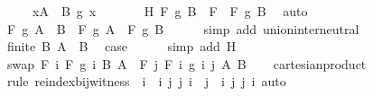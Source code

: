 \begin{isabellebody}
\ \ \ \ \ {\isachardoublequoteopen}{\isasymforall}x{\isasymin}A\ {\isasyminter}\ {\isasymUnion}B{\isachardot}{\kern0pt}\ g\ x\ {\isacharequal}{\kern0pt}\ \isanewline
\ \ \ \ \ H{\isacharcolon}{\kern0pt}\ {\isachardoublequoteopen}F\ g\ {\isacharparenleft}{\kern0pt}{\isasymUnion}B{\isacharparenright}{\kern0pt}\ {\isacharequal}{\kern0pt}\ {\isacharparenleft}{\kern0pt}F\ {\isasymcirc}\ F{\isacharparenright}{\kern0pt}\ g\ B{\isachardoublequoteclose}\ \isamarkupfalse%
\ auto\isanewline
\ \ \isamarkupfalse%
\ \isamarkupfalse%
\ {\isachardoublequoteopen}F\ g\ {\isacharparenleft}{\kern0pt}A\ {\isasymunion}\ {\isasymUnion}B{\isacharparenright}{\kern0pt}\ {\isacharequal}{\kern0pt}\ F\ g\ A\ \isactrlbold {\isacharasterisk}{\kern0pt}\ F\ g\ {\isacharparenleft}{\kern0pt}{\isasymUnion}B{\isacharparenright}{\kern0pt}{\isachardoublequoteclose}\isanewline
\ \ \ \ \isamarkupfalse%
\ {\isacharparenleft}{\kern0pt}simp\ add{\isacharcolon}{\kern0pt}\ union{\isacharunderscore}{\kern0pt}inter{\isacharunderscore}{\kern0pt}neutral{\isacharparenright}{\kern0pt}\isanewline
\ \ \isamarkupfalse%
\ {\isacartoucheopen}finite\ B{\isacartoucheclose}\ {\isacartoucheopen}A\ {\isasymnotin}\ B{\isacartoucheclose}\ \isamarkupfalse%
\ {\isacharquery}{\kern0pt}case\isanewline
\ \ \ \ \isamarkupfalse%
\ {\isacharparenleft}{\kern0pt}simp\ add{\isacharcolon}{\kern0pt}\ H{\isacharparenright}{\kern0pt}\isanewline
{}\isamarkupfalse%
%
\endisatagproof
{\isafoldproof}%
%
\isadelimproof
\isanewline
%
\endisadelimproof
\isanewline
{}\isamarkupfalse%
\ swap{\isacharcolon}{\kern0pt}\ {\isachardoublequoteopen}F\ {\isacharparenleft}{\kern0pt}{\isasymlambda}i{\isachardot}{\kern0pt}\ F\ {\isacharparenleft}{\kern0pt}g\ i{\isacharparenright}{\kern0pt}\ B{\isacharparenright}{\kern0pt}\ A\ {\isacharequal}{\kern0pt}\ F\ {\isacharparenleft}{\kern0pt}{\isasymlambda}j{\isachardot}{\kern0pt}\ F\ {\isacharparenleft}{\kern0pt}{\isasymlambda}i{\isachardot}{\kern0pt}\ g\ i\ j{\isacharparenright}{\kern0pt}\ A{\isacharparenright}{\kern0pt}\ B{\isachardoublequoteclose}\isanewline
%
\isadelimproof
\ \ %
\endisadelimproof
%
\isatagproof
{}\isamarkupfalse%
\ cartesian{\isacharunderscore}{\kern0pt}product\isanewline
\ \ \isamarkupfalse%
\ {\isacharparenleft}{\kern0pt}rule\ reindex{\isacharunderscore}{\kern0pt}bij{\isacharunderscore}{\kern0pt}witness\ {\isacharbrackleft}{\kern0pt}\ i\ {\isacharequal}{\kern0pt}\ {\isachardoublequoteopen}{\isasymlambda}{\isacharparenleft}{\kern0pt}i{\isacharcomma}{\kern0pt}\ j{\isacharparenright}{\kern0pt}{\isachardot}{\kern0pt}\ {\isacharparenleft}{\kern0pt}j{\isacharcomma}{\kern0pt}\ i{\isacharparenright}{\kern0pt}{\isachardoublequoteclose}\ \ j\ {\isacharequal}{\kern0pt}\ {\isachardoublequoteopen}{\isasymlambda}{\isacharparenleft}{\kern0pt}i{\isacharcomma}{\kern0pt}\ j{\isacharparenright}{\kern0pt}{\isachardot}{\kern0pt}\ {\isacharparenleft}{\kern0pt}j{\isacharcomma}{\kern0pt}\ i{\isacharparenright}{\kern0pt}{\isachardoublequoteclose}{\isacharbrackright}{\kern0pt}{\isacharparenright}{\kern0pt}\ auto%

\end{isabellebody}
